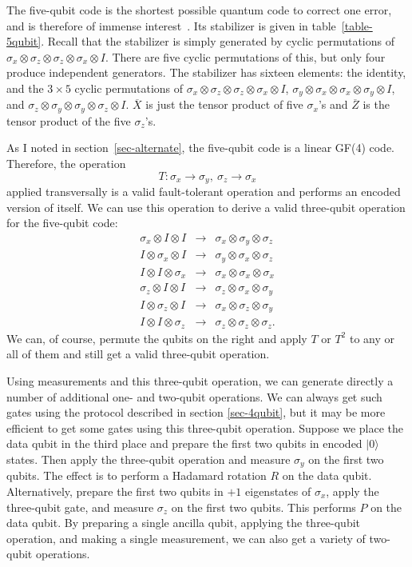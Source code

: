 \documentclass{report}
\newcommand{\ket}[1]{|{#1}\rangle}
\newcommand{\X}{\sigma_x}
\newcommand{\Z}{\sigma_z}
\newcommand{\Y}{\sigma_y}
\newcommand{\Xbar}{\overline{X}}
\newcommand{\Zbar}{\overline{Z}}
\begin{document}
The five-qubit code is the shortest possible quantum code to correct one 
error, and is therefore of immense interest~\cite{bennett-tome, 
laflamme-5qubit}.  Its stabilizer is given in table~\ref{table-5qubit}.  Recall 
that the stabilizer is simply generated by cyclic permutations of $\X 
\otimes \Z \otimes \Z \otimes \X \otimes I$.  There are five cyclic 
permutations of this, but only four produce independent generators.  The 
stabilizer has sixteen elements: the identity, and the $3 \times 5$ cyclic 
permutations of $\X \otimes \Z \otimes \Z \otimes \X \otimes I$, $\Y 
\otimes \X \otimes \X \otimes \Y \otimes I$, and $\Z \otimes \Y \otimes 
\Y \otimes \Z \otimes I$.  $\Xbar$ is just the tensor product of five $\X$'s 
and $\Zbar$ is the tensor product of the five $\Z$'s.

As I noted in section~\ref{sec-alternate}, the five-qubit code is a linear 
GF(4) code.  Therefore, the operation
\begin{equation}
T: \X \rightarrow \Y, \ \Z \rightarrow \X
\end{equation}
applied transversally is a valid fault-tolerant operation and performs an 
encoded version of itself.  We can use this operation to derive a valid 
three-qubit operation for the five-qubit code:
\begin{eqnarray}
\X \otimes I \otimes I & \rightarrow & \X \otimes \Y \otimes \Z 
\nonumber \\
I \otimes \X \otimes I & \rightarrow & \Y \otimes \X \otimes \Z 
\nonumber \\
I \otimes I \otimes \X & \rightarrow & \X \otimes \X \otimes \X \\
\Z \otimes I \otimes I & \rightarrow & \Z \otimes \X \otimes \Y \nonumber 
\\
I \otimes \Z \otimes I & \rightarrow & \X \otimes \Z \otimes \Y \nonumber 
\\
I \otimes I \otimes \Z & \rightarrow & \Z \otimes \Z \otimes \Z. \nonumber
\end{eqnarray}
We can, of course, permute the qubits on the right and apply $T$ or $T^2$ 
to any or all of them and still get a valid three-qubit operation.

Using measurements and this three-qubit operation, we can generate 
directly a number of additional one- and two-qubit operations.  We can 
always get such gates using the protocol described in section \ref{sec-4qubit}, 
but it may be more efficient to get some gates using this three-qubit 
operation.  Suppose we place the data qubit in the third place and prepare 
the first two qubits in encoded $\ket{0}$ states.  Then apply the 
three-qubit operation and measure $\Y$ on the first two qubits.  The effect is 
to perform a Hadamard rotation $R$ on the data qubit.  Alternatively, prepare 
the first two qubits in $+1$ eigenstates of $\X$, apply the three-qubit gate, 
and measure $\Z$ on the first two qubits.  This performs $P$ on the data qubit.
By preparing a single ancilla qubit, applying the three-qubit operation, and
making a single measurement, we can also get a variety of two-qubit operations.
\end{document}
